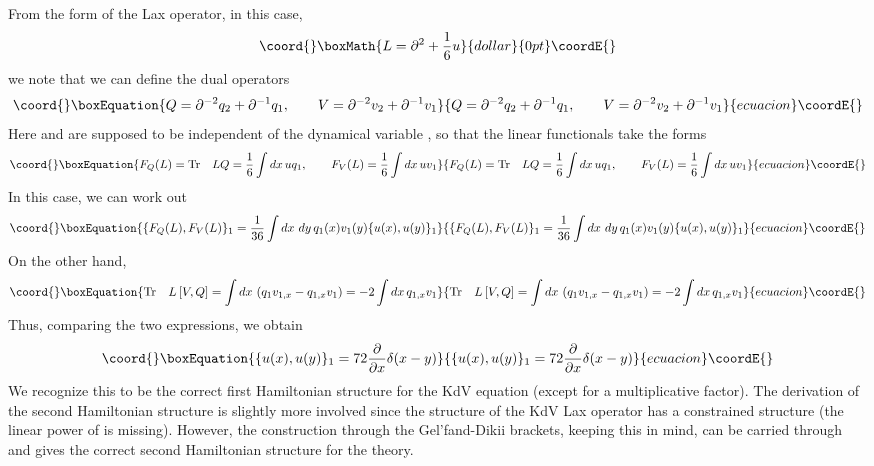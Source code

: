 \documentclass[a4paper,11pt]{article}
\begin{document}
From the form of the Lax operator, in this case,
$$\coord{}\boxMath{
L = \partial^{2} + {1\over 6} u
}{dollar}{0pt}\coordE{}$$
we note that we can define the dual operators
\begin{equation}\coord{}\boxEquation{
Q = \partial^{-2}q_{2} + \partial^{-1}q_{1},\qquad V =
\partial^{-2}v_{2} + \partial^{-1}v_{1}
}{
Q = \partial^{-2}q_{2} + \partial^{-1}q_{1},\qquad V =
\partial^{-2}v_{2} + \partial^{-1}v_{1}
}{ecuacion}\coordE{}\end{equation}
Here \coordHE{} and \coordHE{} are supposed to be independent of the
dynamical variable \coordHE{}, so that the linear functionals take the forms
\begin{equation}\coord{}\boxEquation{
F_{Q}(L) = {\rm Tr}\quad LQ = {1\over 6}\int dx\,uq_{1},\qquad
F_{V}(L) = {1\over 6} \int dx\,uv_{1}
}{
F_{Q}(L) = {\rm Tr}\quad LQ = {1\over 6}\int dx\,uq_{1},\qquad
F_{V}(L) = {1\over 6} \int dx\,uv_{1}
}{ecuacion}\coordE{}\end{equation}
In this case, we can work out
\begin{equation}\coord{}\boxEquation{
\{F_{Q}(L) , F_{V}(L)\}_{1} = {1\over 36} \int dx\
dy\,q_{1}(x)v_{1}(y) \{u(x) , u(y)\}_{1}
}{
\{F_{Q}(L) , F_{V}(L)\}_{1} = {1\over 36} \int dx\
dy\,q_{1}(x)v_{1}(y) \{u(x) , u(y)\}_{1}
}{ecuacion}\coordE{}\end{equation}
On the other hand,
\begin{equation}\coord{}\boxEquation{
{\rm Tr}\quad L \left[V , Q\right] = \int dx\, \left(q_{1}v_{1,x} -
q_{1,x}v_{1}\right) = - 2\int dx\, q_{1,x} v_{1}
}{
{\rm Tr}\quad L \left[V , Q\right] = \int dx\, \left(q_{1}v_{1,x} -
q_{1,x}v_{1}\right) = - 2\int dx\, q_{1,x} v_{1}
}{ecuacion}\coordE{}\end{equation}
Thus, comparing the two expressions, we obtain
\begin{equation}\coord{}\boxEquation{
\{u(x) , u(y)\}_{1} = 72 {\partial\over \partial x}\delta (x-y)
}{
\{u(x) , u(y)\}_{1} = 72 {\partial\over \partial x}\delta (x-y)
}{ecuacion}\coordE{}\end{equation}
We recognize this to be the correct first Hamiltonian structure for
the KdV equation (except for a multiplicative factor). The derivation
of the  second Hamiltonian structure
is slightly more involved since the structure of the KdV Lax operator
has a constrained structure (the linear power of \myHighlight{$\partial$}\coordHE{} is
missing). However, the construction through the Gel'fand-Dikii
brackets, keeping this in mind, can be carried through and gives the
correct second Hamiltonian structure for the theory.  
\end{document}
